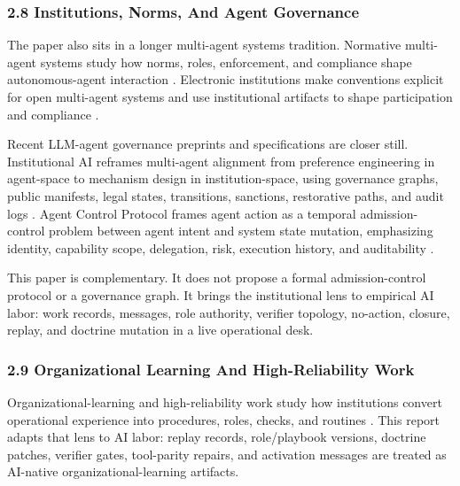\documentclass[
]{article}
\begin{document}
\subsubsection{2.8 Institutions, Norms, And Agent Governance}\label{institutions-norms-and-agent-governance}

The paper also sits in a longer multi-agent systems tradition. Normative multi-agent systems study how norms, roles, enforcement, and compliance shape autonomous-agent interaction \citep{boella2006normativeMultiagentSystems}. Electronic institutions make conventions explicit for open multi-agent systems and use institutional artifacts to shape participation and compliance \citep{esteva2004electronicInstitutions}.

Recent LLM-agent governance preprints and specifications are closer still. Institutional AI reframes multi-agent alignment from preference engineering in agent-space to mechanism design in institution-space, using governance graphs, public manifests, legal states, transitions, sanctions, restorative paths, and audit logs \citep{bracaleSyrnikov2026institutionalCournot, pierucci2026institutionalDistributional}. Agent Control Protocol frames agent action as a temporal admission-control problem between agent intent and system state mutation, emphasizing identity, capability scope, delegation, risk, execution history, and auditability \citep{fernandez2026agentControlProtocol, acp2026architecture}.

This paper is complementary. It does not propose a formal admission-control protocol or a governance graph. It brings the institutional lens to empirical AI labor: work records, messages, role authority, verifier topology, no-action, closure, replay, and doctrine mutation in a live operational desk.

\subsubsection{2.9 Organizational Learning And High-Reliability Work}\label{organizational-learning-and-high-reliability-work}

Organizational-learning and high-reliability work study how institutions convert operational experience into procedures, roles, checks, and routines \citep{argyrisSchon1978organizationalLearning, weickSutcliffe2015managingUnexpected}. This report adapts that lens to AI labor: replay records, role/playbook versions, doctrine patches, verifier gates, tool-parity repairs, and activation messages are treated as AI-native organizational-learning artifacts.
\end{document}
